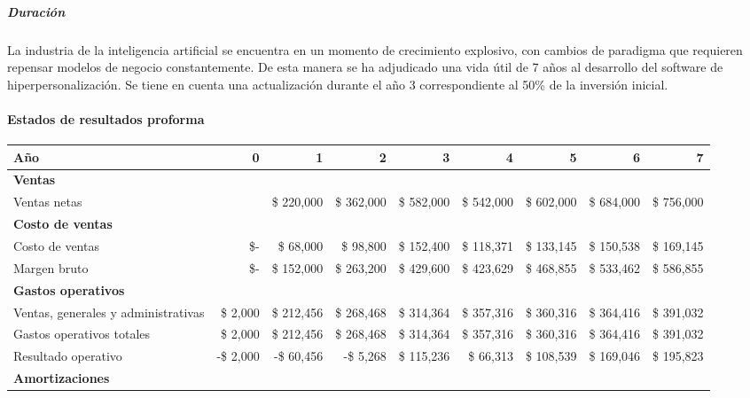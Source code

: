 \subparagraph{Duración}

La industria de la inteligencia artificial se encuentra en un momento de crecimiento explosivo, con cambios de paradigma que requieren repensar modelos de negocio constantemente. De esta manera se ha adjudicado una vida útil de 7 años al desarrollo del software de hiperpersonalización. Se tiene en cuenta una actualización durante el año 3 correspondiente al 50\% de la inversión inicial.


\clearpage


\paragraph{Estados de resultados proforma}

\begin{center}
\footnotesize
\begin{adjustbox}{width=\textwidth,center}
\begin{tabular}{l|rrrrrrrr}
\hline
\textbf{Año} & \textbf{0} & \textbf{1} & \textbf{2} & \textbf{3} & \textbf{4} & \textbf{5} & \textbf{6} & \textbf{7} \\
\hline
\multicolumn{9}{l}{\textbf{Ventas}} \\
\hline
Ventas netas & & \$ 220,000 & \$ 362,000 & \$ 582,000 & \$ 542,000 & \$ 602,000 & \$ 684,000 & \$ 756,000 \\
\hline
\multicolumn{9}{l}{\textbf{Costo de ventas}} \\
\hline
Costo de ventas & \$- & \$ 68,000 & \$ 98,800 & \$ 152,400 & \$ 118,371 & \$ 133,145 & \$ 150,538 & \$ 169,145 \\
\hline
Margen bruto & \$- & \$ 152,000 & \$ 263,200 & \$ 429,600 & \$ 423,629 & \$ 468,855 & \$ 533,462 & \$ 586,855 \\
\hline
\multicolumn{9}{l}{\textbf{Gastos operativos}} \\
\hline
Ventas, generales y administrativas & \$ 2,000 & \$ 212,456 & \$ 268,468 & \$ 314,364 & \$ 357,316 & \$ 360,316 & \$ 364,416 & \$ 391,032 \\
\hline
Gastos operativos totales & \$ 2,000 & \$ 212,456 & \$ 268,468 & \$ 314,364 & \$ 357,316 & \$ 360,316 & \$ 364,416 & \$ 391,032 \\
\hline
Resultado operativo & -\$ 2,000 & -\$ 60,456 & -\$ 5,268 & \$ 115,236 & \$ 66,313 & \$ 108,539 & \$ 169,046 & \$ 195,823 \\
\hline
\multicolumn{9}{l}{\textbf{Amortizaciones}} \\

\end{tabular}
\end{adjustbox}
\end{center}
